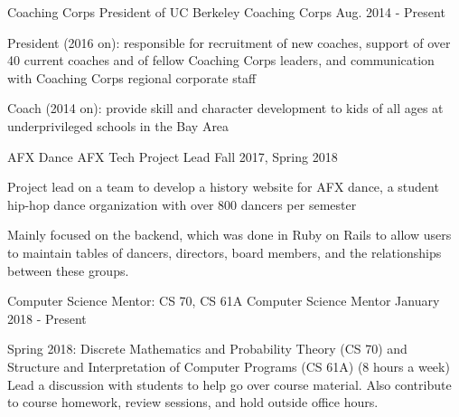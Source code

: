\begin{cventries}
  \cventry
    {Coaching Corps} %
    {President of UC Berkeley Coaching Corps} %
    {Aug. 2014 - Present} %
    {} %
    {
      \begin{cvitems} %
        \item {President (2016 on): responsible for recruitment of new coaches, support of over 40 current coaches and of fellow Coaching Corps leaders, and communication with Coaching Corps regional corporate staff}
        \item {Coach (2014 on): provide skill and character development to kids of all ages at underprivileged schools in the Bay Area}
      \end{cvitems}
    }
   \cventry
    {AFX Dance} %
    {AFX Tech Project Lead} %
    {Fall 2017, Spring 2018} %
    {} %
    {
      \begin{cvitems} %
        \item {Project lead on a team to develop a history website for AFX dance, a student hip-hop dance organization with over 800 dancers per semester}
        \item {Mainly focused on the backend, which was done in Ruby on Rails to allow users to maintain tables of dancers, directors, board members, and the relationships between these groups.}
      \end{cvitems}
     }

  \cventry
    {Computer Science Mentor: CS 70, CS 61A} %
    {Computer Science Mentor} %
    {January 2018 - Present} %
    {} %
    {
      \begin{cvitems} %
        \item {Spring 2018: Discrete Mathematics and Probability Theory (CS 70) and Structure and Interpretation of Computer Programs (CS 61A) (8 hours a week) Lead a discussion with students to help go over course material. Also contribute to course homework, review sessions, and hold outside office hours.}
      \end{cvitems}
    }
    

\end{cventries}
